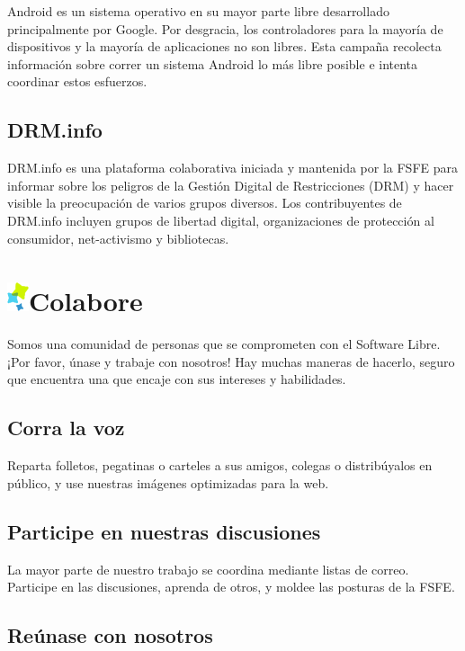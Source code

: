 \documentclass[10pt,foldmark,tumble]{leaflet}
\begin{document}
    Android es un sistema operativo en su mayor parte libre desarrollado principalmente por Google. Por desgracia, los controladores para la mayoría de dispositivos y la mayoría de aplicaciones no son libres. Esta campaña recolecta información sobre correr un sistema Android lo más libre posible e intenta coordinar estos esfuerzos.
    
\subsection{DRM.info}

    DRM.info es una plataforma colaborativa iniciada y mantenida por la FSFE para informar sobre los peligros de la Gestión Digital de Restricciones (DRM) y hacer visible la preocupación de varios grupos diversos. Los contribuyentes de DRM.info incluyen grupos de libertad digital, organizaciones de protección al consumidor, net-activismo y bibliotecas.
    
\section{\includegraphics{item.png}Colabore}

 Somos una comunidad de personas que se comprometen con el Software Libre. ¡Por favor, únase y trabaje con nosotros! Hay muchas maneras de hacerlo, seguro que encuentra una que encaje con sus intereses y habilidades.

\subsection{Corra la voz}

    Reparta folletos, pegatinas o carteles a sus amigos, colegas o distribúyalos en público, y use nuestras imágenes optimizadas para la web.
    
\subsection{Participe en nuestras discusiones}

    La mayor parte de nuestro trabajo se coordina mediante listas de correo. Participe en las discusiones, aprenda de otros, y moldee las posturas de la FSFE.

\subsection{Reúnase con nosotros}
\end{document}
